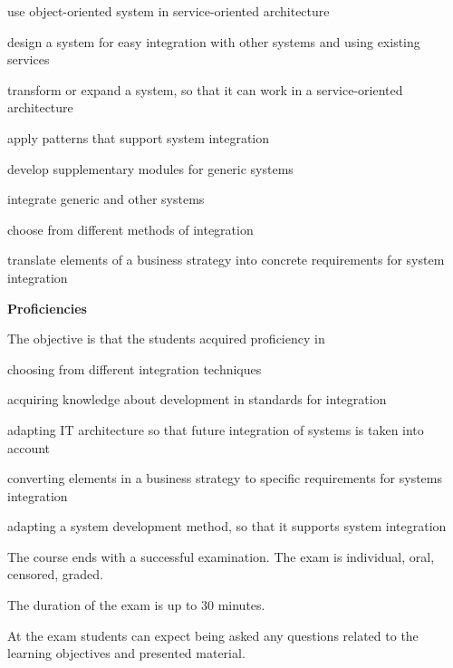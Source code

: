 \documentclass[Screen16to9,17pt]{foils}
\begin{document}
\begin{list2}
\item use object-oriented system in service-oriented architecture
\item design a system for easy integration with other systems and using existing services
\item transform or expand a system, so that it can work in a service-oriented architecture
\item apply patterns that support system integration
\item develop supplementary modules for generic systems
\item integrate generic and other systems
\item choose from different methods of integration
\item translate elements of a business strategy into concrete requirements for system integration
\end{list2}


{\bf Proficiencies}

The objective is that the students acquired proficiency in

\begin{list2}
\item choosing from different integration techniques
\item acquiring knowledge about development in standards for integration
\item adapting IT architecture so that future integration of systems is taken into account
\item converting elements in a business strategy to specific requirements for systems integration
\item adapting a system development method, so that it supports system integration
\end{list2}



\begin{list2}
\item The course ends with a successful examination. The exam is individual, oral, censored, graded.
\item The duration of the exam is up to 30 minutes.
\item At the exam students can expect being asked any questions related to the learning objectives and presented material.
\end{list2}
\end{document}
